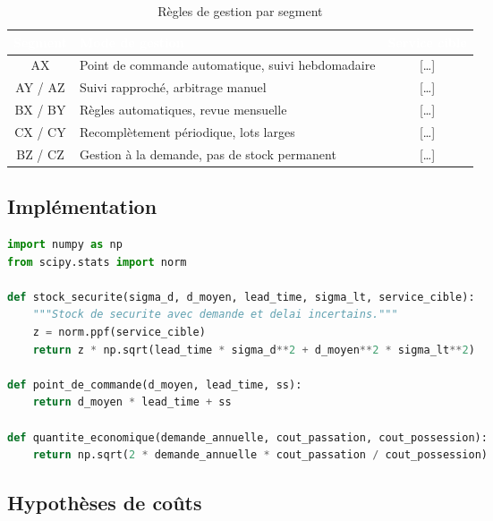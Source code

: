 \begin{table}[H]
  \centering
  \caption{Règles de gestion par segment}
  \label{tab:regles_segment}
  \renewcommand{\arraystretch}{1.4}
  \begin{tabularx}{\textwidth}{|c|X|c|}
    \hline
    \rowcolor{iacsTableHead}
    \textcolor{white}{\textbf{Segment}} &
    \textcolor{white}{\textbf{Mode de gestion}} &
    \textcolor{white}{\textbf{Service cible}} \\
    \hline
    AX & Point de commande automatique, suivi hebdomadaire & [\ldots] \\
    \hline
    \rowcolor{iacsLightGray}
    AY / AZ & Suivi rapproché, arbitrage manuel & [\ldots] \\
    \hline
    BX / BY & Règles automatiques, revue mensuelle & [\ldots] \\
    \hline
    \rowcolor{iacsLightGray}
    CX / CY & Recomplètement périodique, lots larges & [\ldots] \\
    \hline
    BZ / CZ & Gestion à la demande, pas de stock permanent & [\ldots] \\
    \hline
  \end{tabularx}
\end{table}

\subsection{Implémentation}

\begin{lstlisting}[language=Python, caption={Calcul du stock de sécurité et du point de commande}, label={lst:ss_rop}]
import numpy as np
from scipy.stats import norm

def stock_securite(sigma_d, d_moyen, lead_time, sigma_lt, service_cible):
    """Stock de securite avec demande et delai incertains."""
    z = norm.ppf(service_cible)
    return z * np.sqrt(lead_time * sigma_d**2 + d_moyen**2 * sigma_lt**2)

def point_de_commande(d_moyen, lead_time, ss):
    return d_moyen * lead_time + ss

def quantite_economique(demande_annuelle, cout_passation, cout_possession):
    return np.sqrt(2 * demande_annuelle * cout_passation / cout_possession)
\end{lstlisting}

\subsection{Hypothèses de coûts}


